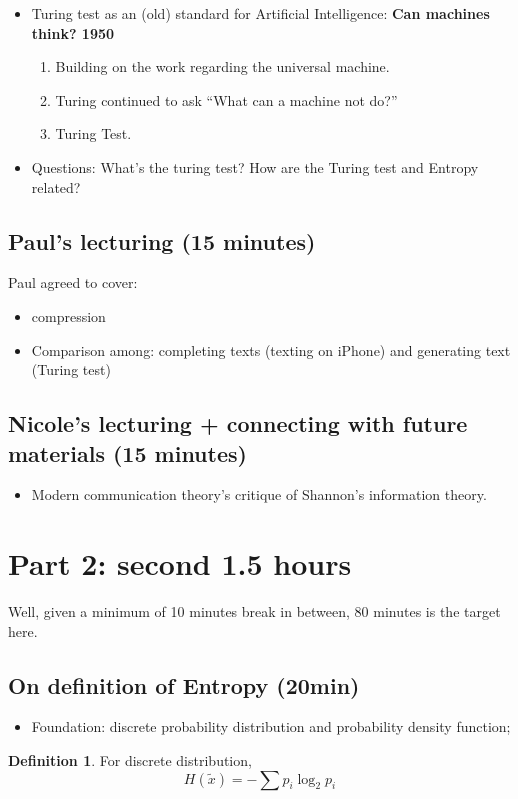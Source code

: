 \documentclass[12pt]{article}
\theoremstyle{definition}
\newtheorem{definition}[theorem]{Definition}
\theoremstyle{plain}
\begin{document}
\begin{itemize}
\begin{itemize}
        \end{itemize}
    \item Turing test as an (old) standard for Artificial Intelligence:
        \textbf{Can machines think? 1950 }
        \begin{enumerate}
            \item Building on the work regarding the universal machine.
            \item Turing continued to ask “What can a machine not do?”
            \item Turing Test.
        \end{enumerate}
    \item Questions: What’s the turing test? How are the Turing test and Entropy related?
\end{itemize}



\subsection{Paul's lecturing (15 minutes)}
Paul agreed to cover:
\begin{itemize}
    \item compression
    \item Comparison among: completing texts (texting on iPhone) and generating
        text (Turing test)
\end{itemize}



\subsection{Nicole's lecturing + connecting with future materials (15 minutes)}
\begin{itemize}
    \item Modern communication theory's critique of Shannon's information
        theory.
\end{itemize}



\section{Part 2: second 1.5 hours}
Well, given a minimum of 10 minutes break in between, 80 minutes is the target
here.

\subsection{On definition of Entropy (20min) }
        \begin{itemize}
            \item Foundation: discrete probability distribution and probability density function;
        \end{itemize}
\begin{definition}
    For discrete distribution,
    \[
        H(\tilde x) = - \sum p_i \log_{2} p_i
    \]
\end{definition}
\end{document}
